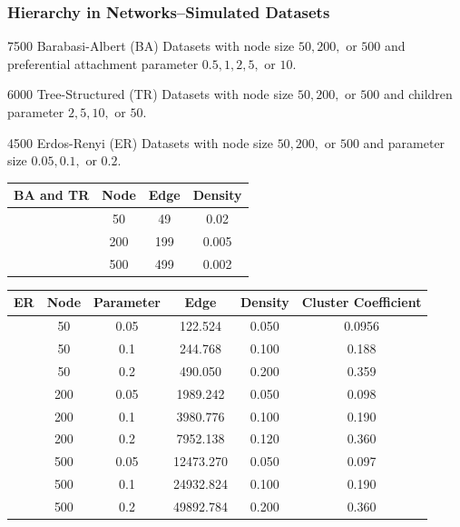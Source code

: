\documentclass{beamer}
\begin{document}
\begin{frame}\frametitle{Hierarchy in Networks--Simulated Datasets}
	\begin{itemize}
		\small{
		\item 7500 Barabasi-Albert (BA) Datasets with node size $50, 200,$ or $500$ and preferential attachment parameter $0.5, 1, 2, 5,$ or $10$.
		\item 6000 Tree-Structured (TR) Datasets with node size $50, 200,$ or $500$ and children parameter $2, 5, 10,$ or $50$.
		\item 4500 Erdos-Renyi (ER) Datasets with node size $50, 200,$ or $500$ and parameter size $0.05, 0.1,$ or $0.2$.}
		\scriptsize
			\begin{table}
				\begin{tabular}{| r || c | c | c |}
					\hline
					 BA and TR & Node & Edge & Density     \\
					\hline
					 &  50&  49&  0.02    \\	
					 &  200& 199&  0.005    \\
					 &  500& 499&  0.002    \\
					\hline
					\end{tabular}
				\end{table}
				\begin{table}
					\begin{tabular}{| r || c | c | c |c| c|}
						\hline
						ER & Node & Parameter& Edge & Density&Cluster Coefficient \\
						\hline
						& 50& 0.05&122.524 & 0.050 &  0.0956  \\
						  & 50& 0.1&244.768 & 0.100 &  0.188   \\
						  & 50& 0.2&490.050 & 0.200 &  0.359   \\	
						  &200&0.05&1989.242 &0.050&    0.098\\
						  &200&0.1&3980.776& 0.100&     0.190\\
						  &200&0.2&7952.138& 0.120&     0.360\\
						  &500&0.05&12473.270& 0.050&    0.097\\
						  &500&0.1&24932.824& 0.100&       0.190\\
						  &500&0.2&49892.784& 0.200&  0.360	\\			
						\hline
					\end{tabular}
				\end{table}
	\end{itemize}
\end{frame}
\end{document}
